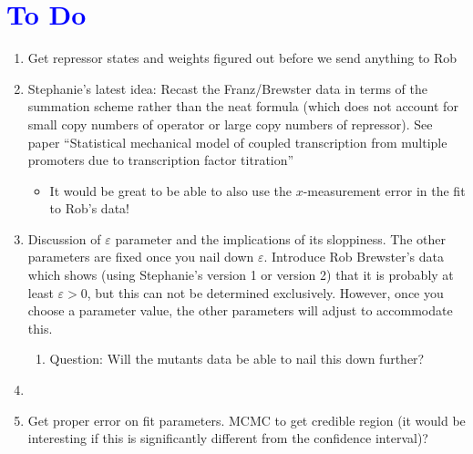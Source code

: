 \section*{\textcolor{blue}{To Do}}

\begin{enumerate}
	\item Get repressor states and weights figured out before we send anything to Rob
	
	\item Stephanie's latest idea: Recast the Franz/Brewster data in terms of the summation scheme rather than the neat formula (which does not account for small copy numbers of operator or large copy numbers of repressor). See paper ``Statistical mechanical model of coupled transcription from multiple promoters due to transcription factor titration''
	\begin{itemize}
		\item It would be great to be able to also use the $x$-measurement error in the fit to Rob's data!
	\end{itemize}
	
	\item Discussion of $\varepsilon$ parameter and the implications of its sloppiness. The other parameters are fixed once you nail down $\varepsilon$. Introduce Rob Brewster's data  which shows (using Stephanie's version 1 or version 2) that it is probably at least $\varepsilon > 0$, but this can not be determined exclusively. However, once you choose a parameter value, the other parameters will adjust to accommodate this.
	\begin{enumerate}
		\item Question: Will the mutants data be able to nail this down further?
	\end{enumerate}
	
	\item {}
	
	\item Get proper error on fit parameters. MCMC to get credible region (it would be interesting if this is significantly different from the confidence interval)?
\end{enumerate}
